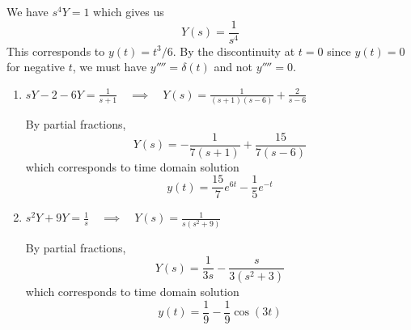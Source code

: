 \documentclass[a4paper]{article}
\begin{document}

We have \( s^{4}Y = 1 \) which gives us
\[
	Y \!\left( s \right) = \frac{1}{s^{4}} 
\]
This corresponds to \( y \!\left( t \right) = t^{3} / 6 \). By the discontinuity at \( t = 0 \) since \( y \!\left( t \right) = 0 \) for negative \( t \), we must have \( y'''' = \delta \!\left( t \right) \) and not \( y'''' = 0 \).

\vspace{12pt}


\begin{enumerate}[label=(\alph*)]
	\item \( sY - 2 - 6Y = \displaystyle{\frac{1}{s + 1}} \quad \implies \quad Y \!\left( s \right) = \displaystyle{\frac{1}{\!\left( s + 1 \right)\!\left( s - 6 \right)} + \frac{2}{s - 6}} \)

	By partial fractions,
	\[
		Y \!\left( s \right) = -\frac{1}{7 \!\left( s + 1 \right)} + \frac{15}{7 \!\left( s - 6 \right)}
	\]
	which corresponds to time domain solution
	\[
		y \!\left( t \right) = \frac{15}{7}e^{6t} - \frac{1}{5}e^{-t}
	\]
	\item \( s^{2}Y + 9Y = \displaystyle{\frac{1}{s}} \quad \implies \quad Y \!\left( s \right) = \frac{1}{s \!\left( s^{2} + 9 \right)} \)

	By partial fractions,
	\[
		Y \!\left( s \right) = \frac{1}{3s} - \frac{s}{3 \!\left( s^{2} + 3 \right)} 
	\]
	which corresponds to time domain solution
	\[
		y \!\left( t \right) = \frac{1}{9} - \frac{1}{9}\cos\!\left(3t\right)  
	\]
\end{enumerate}
\end{document}
